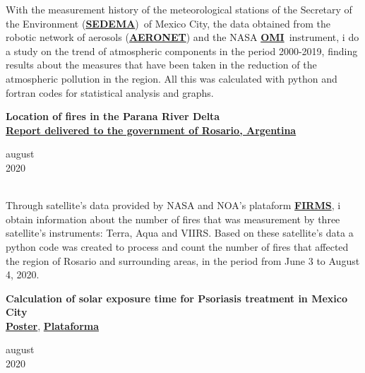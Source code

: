 \documentclass[a3paper]{adcv_color}
\newcommand*{\aeronet}{\href{https://aeronet.gsfc.nasa.gov/}{\textbf{AERONET}}}
\newcommand*{\sedema}{\href{https://www.sedema.cdmx.gob.mx/}{\textbf{SEDEMA}}}
\newcommand*{\omi}{\href{https://aura.gsfc.nasa.gov/omi.html}{\textbf{OMI}}}
\begin{document}
\begin{multicols}{2}
    With the measurement history of the meteorological stations of the Secretary of the Environment (\sedema)~of Mexico City,
    the data obtained from the robotic network of aerosols (\aeronet) and the NASA \omi~instrument, i do a study on the trend of atmospheric components
     in the period 2000-2019, finding results about the measures that have been taken in the reduction of the atmospheric pollution in the region.
     All this was calculated with python and fortran codes for statistical analysis and graphs.\\

  \begin{minipage}{0.8\linewidth}
    \textbf{Location of fires in the Parana River Delta}\\
    \href{https://github.com/giovannilopez9808/Posters_templates/blob/master/Informe\%20IFIR/Focos\%20de\%20incendio\%20en\%20las\%20islas\%20del\%20Paran\%C3\%A1\%20\%20frente\%20a\%20Rosario\%20\%20(Piacentini\%2C\%20Ipi\%C3\%B1a\%2C\%20Lopez-Padilla\%2C\%20Bolmaro)\%20(Piacentini).pdf}{\textbf{Report delivered to the government of Rosario, Argentina}}
  \end{minipage}
    \begin{minipage}{0.2\linewidth}
      \vspace{-0.7cm}
      \begin{flushright}
        august
        \\2020
      \end{flushright}
    \end{minipage}\\
  
    Through satellite's data provided by NASA and NOA's plataform \href{https://firms.modaps.eosdis.nasa.gov/}{\textbf{FIRMS}}, i obtain information about the
    number of fires that was measurement by three satellite's instruments: Terra, Aqua and VIIRS. Based on these satellite's data a python code was created
    to process and count the number of fires that affected the region of Rosario and surrounding areas, in the period from June 3 to August 4, 2020.\vspace{1cm}\\
  \begin{minipage}{0.8\linewidth}
    \textbf{Calculation of solar exposure time for Psoriasis treatment in Mexico City}\\
    \href{https://github.com/giovannilopez9808/Posters_templates/blob/master/2020/CNF/TES/main.pdf}{\textbf{Poster}}, \href{http://tes-v1.herokuapp.com/}{\textbf{Plataforma}}
  \end{minipage}
    \begin{minipage}{0.2\linewidth}
      \vspace{-0.9cm}
      \begin{flushright}
      august \\2020
      \end{flushright}
    \end{minipage}\\


\end{multicols}
\end{document}

